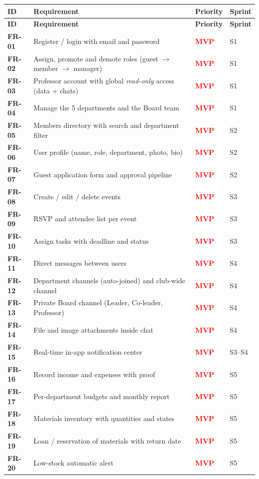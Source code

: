 \documentclass[12pt,a4paper]{report}
\newcommand{\vprio}{\textcolor{red}{\textbf{MVP}}}
\begin{document}
\begin{longtable}{>{\bfseries}p{1.4cm} p{9.2cm} p{2.4cm} p{1.6cm}}
\toprule
\textbf{ID} & \textbf{Requirement} & \textbf{Priority} & \textbf{Sprint} \\
\midrule
\endfirsthead
\toprule
\textbf{ID} & \textbf{Requirement} & \textbf{Priority} & \textbf{Sprint} \\
\midrule
\endhead
FR-01 & Register / login with email and password & \vprio & S1 \\
FR-02 & Assign, promote and demote roles (guest $\rightarrow$ member $\rightarrow$ manager) & \vprio & S1 \\
FR-03 & Professor account with global \emph{read-only} access (data + chats) & \vprio & S1 \\
FR-04 & Manage the 5 departments and the Board team & \vprio & S1 \\
FR-05 & Members directory with search and department filter & \vprio & S2 \\
FR-06 & User profile (name, role, department, photo, bio) & \vprio & S2 \\
FR-07 & Guest application form and approval pipeline & \vprio & S2 \\
FR-08 & Create / edit / delete events & \vprio & S3 \\
FR-09 & RSVP and attendee list per event & \vprio & S3 \\
FR-10 & Assign tasks with deadline and status & \vprio & S3 \\
FR-11 & Direct messages between users & \vprio & S4 \\
FR-12 & Department channels (auto-joined) and club-wide channel & \vprio & S4 \\
FR-13 & Private Board channel (Leader, Co-leader, Professor) & \vprio & S4 \\
FR-14 & File and image attachments inside chat & \vprio & S4 \\
FR-15 & Real-time in-app notification center & \vprio & S3--S4 \\
FR-16 & Record income and expenses with proof & \vprio & S5 \\
FR-17 & Per-department budgets and monthly report & \vprio & S5 \\
FR-18 & Materials inventory with quantities and states & \vprio & S5 \\
FR-19 & Loan / reservation of materials with return date & \vprio & S5 \\
FR-20 & Low-stock automatic alert & \vprio & S5 \\

\end{longtable}
\end{document}
